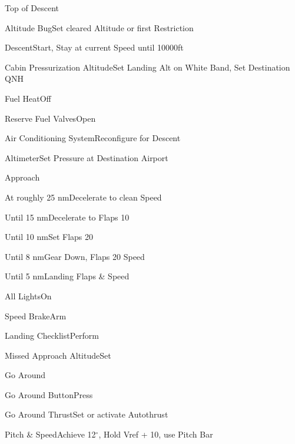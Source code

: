 \documentclass[sim-use, blue_items]{checklist}
\begin{document}
\begin{checklist}{Top of Descent}
	\item{Altitude Bug}{Set cleared Altitude or first Restriction}
	\item{Descent}{Start, Stay at current Speed until 10000ft}
	\item{Cabin Pressurization Altitude}{Set Landing Alt on White Band, Set Destination QNH}
	\item{Fuel Heat}{Off}
	\item{Reserve Fuel Valves}{Open}
	\item{Air Conditioning System}{Reconfigure for Descent}
	 {
		\item{Altimeter}{Set Pressure at Destination Airport}
	}
\end{checklist}

\begin{checklist}{Approach}
	\item{At roughly 25 nm}{Decelerate to clean Speed}
	\item{Until 15 nm}{Decelerate to Flaps 10}
	\item{Until 10 nm}{Set Flaps 20}
	\item{Until 8 nm}{Gear Down, Flaps 20 Speed}
	\item{Until 5 nm}{Landing Flaps \& Speed}
	\item{All Lights}{On}
	\item{Speed Brake}{Arm}
	\item{Landing Checklist}{Perform}
	 {
		\item{Missed Approach Altitude}{Set}
	}
\end{checklist}

\begin{checklist}{Go Around}
	\item{Go Around Button}{Press}
	\item{Go Around Thrust}{Set or activate Autothrust}
	\item{Pitch \& Speed}{Achieve 12$^\circ$, Hold Vref + 10, use Pitch Bar}
\end{checklist}
\end{document}
